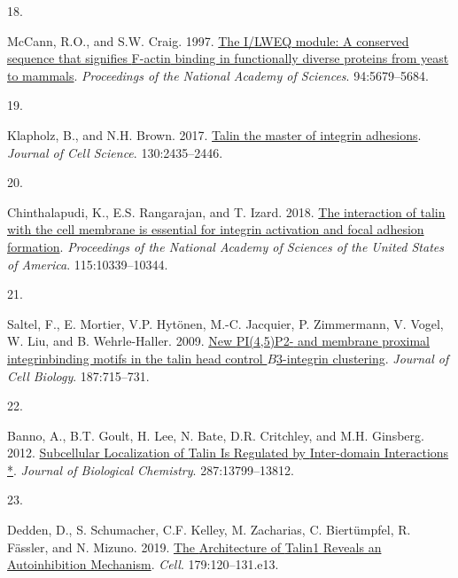 \documentclass[
  twocolumn]{biophys-new-mod}
\newlength{\cslhangindent}
\newlength{\csllabelwidth}
\newlength{\cslentryspacingunit} %
\newenvironment{CSLReferences}[2] %
 {%
  \setlength{\parindent}{0pt}
  \ifodd #1
  \let\oldpar\par
  \def\par{\hangindent=\cslhangindent\oldpar}
  \fi
  \setlength{\parskip}{#2\cslentryspacingunit}
 }%
 {}
\newcommand{\CSLLeftMargin}[1]{\parbox[t]{\csllabelwidth}{#1}}
\newcommand{\CSLRightInline}[1]{\parbox[t]{\linewidth - \csllabelwidth}{#1}\break}
\begin{document}
\begin{CSLReferences}{0}{0}
\leavevmode{}%
\CSLLeftMargin{18. }%
\CSLRightInline{McCann, R.O., and S.W. Craig. 1997.
\href{https://doi.org/10.1073/pnas.94.11.5679}{The {I}/{LWEQ} module: A
conserved sequence that signifies {F-actin} binding in functionally
diverse proteins from yeast to mammals}. \emph{Proceedings of the
National Academy of Sciences}. 94:5679--5684.}

\leavevmode{}%
\CSLLeftMargin{19. }%
\CSLRightInline{Klapholz, B., and N.H. Brown. 2017.
\href{https://doi.org/10.1242/jcs.190991}{Talin \textendash{} the master
of integrin adhesions}. \emph{Journal of Cell Science}. 130:2435--2446.}

\leavevmode{}%
\CSLLeftMargin{20. }%
\CSLRightInline{Chinthalapudi, K., E.S. Rangarajan, and T. Izard. 2018.
\href{https://doi.org/10.1073/pnas.1806275115}{The interaction of talin
with the cell membrane is essential for integrin activation and focal
adhesion formation}. \emph{Proceedings of the National Academy of
Sciences of the United States of America}. 115:10339--10344.}

\leavevmode{}%
\CSLLeftMargin{21. }%
\CSLRightInline{Saltel, F., E. Mortier, V.P. Hytönen, M.-C. Jacquier, P.
Zimmermann, V. Vogel, W. Liu, and B. Wehrle-Haller. 2009.
\href{https://doi.org/10.1083/jcb.200908134}{New {PI}(4,5){P2-} and
membrane proximal integrin\textendash binding motifs in the talin head
control {\(B\)}3-integrin clustering}. \emph{Journal of Cell Biology}.
187:715--731.}

\leavevmode{}%
\CSLLeftMargin{22. }%
\CSLRightInline{Banno, A., B.T. Goult, H. Lee, N. Bate, D.R. Critchley,
and M.H. Ginsberg. 2012.
\href{https://doi.org/10.1074/jbc.M112.341214}{Subcellular
{Localization} of {Talin Is Regulated} by {Inter-domain Interactions}
*}. \emph{Journal of Biological Chemistry}. 287:13799--13812.}

\leavevmode{}%
\CSLLeftMargin{23. }%
\CSLRightInline{Dedden, D., S. Schumacher, C.F. Kelley, M. Zacharias, C.
Biertümpfel, R. Fässler, and N. Mizuno. 2019.
\href{https://doi.org/10.1016/j.cell.2019.08.034}{The {Architecture} of
{Talin1 Reveals} an {Autoinhibition Mechanism}}. \emph{Cell}.
179:120--131.e13.}


\end{CSLReferences}
\end{document}
